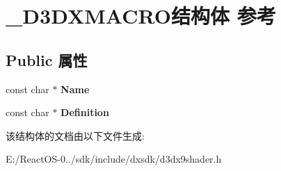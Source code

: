 \hypertarget{struct___d3_d_x_m_a_c_r_o}{}\section{\+\_\+\+D3\+D\+X\+M\+A\+C\+R\+O结构体 参考}
\label{struct___d3_d_x_m_a_c_r_o}
\subsection*{Public 属性}
\begin{DoxyCompactItemize}
\item 
\mbox{\label{struct___d3_d_x_m_a_c_r_o_ab1383f5b46cac3aa4b0ac36b00fef4bc}} 
const char $\ast$ {\bfseries Name}
\item 
\mbox{\label{struct___d3_d_x_m_a_c_r_o_a0b461a6fbe96607a561492782a47056f}} 
const char $\ast$ {\bfseries Definition}
\end{DoxyCompactItemize}


该结构体的文档由以下文件生成\+:\begin{DoxyCompactItemize}
\item 
E\+:/\+React\+O\+S-\/0../sdk/include/dxsdk/d3dx9shader.\+h\end{DoxyCompactItemize}
